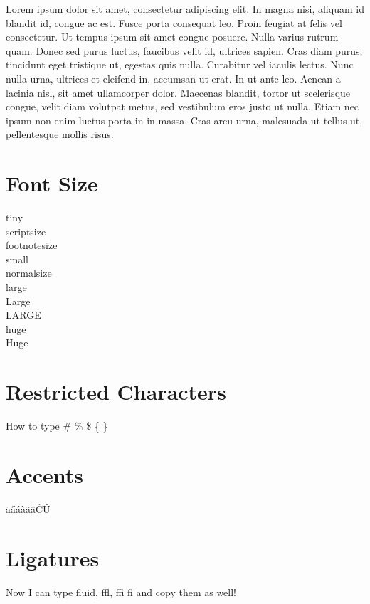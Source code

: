 \documentclass[10pt]{article}
\begin{document}
 

\flushleft
Lorem ipsum dolor sit amet, consectetur adipiscing elit. In magna nisi, aliquam id blandit id, congue ac est. Fusce porta consequat leo. Proin feugiat at felis vel consectetur. Ut tempus ipsum sit amet congue posuere. Nulla varius rutrum quam. Donec sed purus luctus, faucibus velit id, ultrices sapien. Cras diam purus, tincidunt eget tristique ut, egestas quis nulla. Curabitur vel iaculis lectus. Nunc nulla urna, ultrices et eleifend in, accumsan ut erat. In ut ante leo. Aenean a lacinia nisl, sit amet ullamcorper dolor. Maecenas blandit, tortor ut scelerisque congue, velit diam volutpat metus, sed vestibulum eros justo ut nulla. Etiam nec ipsum non enim luctus porta in in massa. Cras arcu urna, malesuada ut tellus ut, pellentesque mollis risus.


\section{Font Size}

\flushleft

\tiny
tiny \\
\scriptsize
scriptsize \\
\footnotesize
footnotesize \\
\small
small\\
\normalsize
normalsize \\
\large
large \\
\Large
Large \\
\LARGE
LARGE \\
\huge
huge \\
\Huge
Huge \\


\normalsize

\section{Restricted Characters}

How to type \# \% \$ \{ \} \\

\section{Accents}

\"{a}\H{a}\'{a}\`{a}\~{a}\^{a}\'{C}\u{U}

\section{Ligatures}

Now I can type fluid, ffl, ffi fi and copy them as well!
\end{document}
